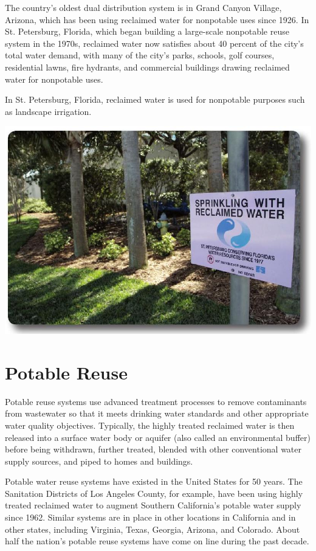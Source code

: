 \documentclass[10pt]{article}
\begin{document}
The country's oldest dual distribution system is in Grand Canyon Village, Arizona, which has been using reclaimed water for nonpotable uses since 1926. In St. Petersburg, Florida, which began building a large-scale nonpotable reuse system in the 1970s, reclaimed water now satisfies about 40 percent of the city's total water demand, with many of the city's parks, schools, golf courses, residential lawns, fire hydrants, and commercial buildings drawing reclaimed water for nonpotable uses.

In St. Petersburg, Florida, reclaimed water is used for nonpotable purposes such as landscape irrigation.

\includegraphics[max width=\textwidth]{2022_11_05_93277ca2de7ec5580550g-02(1)}

\section{Potable Reuse}
Potable reuse systems use advanced treatment processes to remove contaminants from wastewater so that it meets drinking water standards and other appropriate water quality objectives. Typically, the highly treated reclaimed water is then released into a surface water body or aquifer (also called an environmental buffer) before being withdrawn, further treated, blended with other conventional water supply sources, and piped to homes and buildings.

Potable water reuse systems have existed in the United States for 50 years. The Sanitation Districts of Los Angeles County, for example, have been using highly treated reclaimed water to augment Southern California's potable water supply since 1962. Similar systems are in place in other locations in California and in other states, including Virginia, Texas, Georgia, Arizona, and Colorado. About half the nation's potable reuse systems have come on line during the past decade.\\
\end{document}
